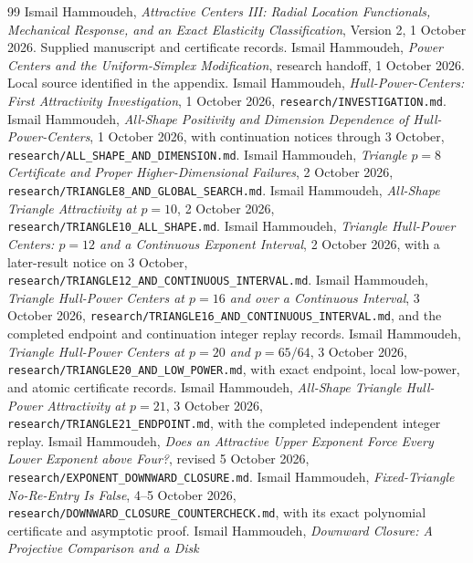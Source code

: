 \documentclass[11pt]{article}
\theoremstyle{definition}
\newcommand{\pathcode}[1]{\nolinkurl{#1}}
\begin{document}
\begin{thebibliography}{99}
Ismail Hammoudeh, \emph{Attractive Centers III: Radial Location Functionals,
Mechanical Response, and an Exact Elasticity Classification}, Version 2,
1 October 2026. Supplied manuscript and certificate records.
Ismail Hammoudeh, \emph{Power Centers and the Uniform-Simplex Modification}, research handoff,
1 October 2026. Local source identified in the appendix.
Ismail Hammoudeh, \emph{Hull-Power-Centers: First Attractivity Investigation},
1 October 2026, \pathcode{research/INVESTIGATION.md}.
Ismail Hammoudeh, \emph{All-Shape Positivity and Dimension Dependence of Hull-Power-Centers},
1 October 2026, with continuation notices through 3 October,
\pathcode{research/ALL_SHAPE_AND_DIMENSION.md}.
Ismail Hammoudeh, \emph{Triangle $p=8$ Certificate and Proper Higher-Dimensional Failures},
2 October 2026, \pathcode{research/TRIANGLE8_AND_GLOBAL_SEARCH.md}.
Ismail Hammoudeh, \emph{All-Shape Triangle Attractivity at $p=10$}, 2 October 2026,
\pathcode{research/TRIANGLE10_ALL_SHAPE.md}.
Ismail Hammoudeh, \emph{Triangle Hull-Power Centers: $p=12$ and a Continuous Exponent Interval},
2 October 2026, with a later-result notice on 3 October,
\pathcode{research/TRIANGLE12_AND_CONTINUOUS_INTERVAL.md}.
Ismail Hammoudeh, \emph{Triangle Hull-Power Centers at $p=16$ and over a Continuous Interval},
3 October 2026, \pathcode{research/TRIANGLE16_AND_CONTINUOUS_INTERVAL.md},
and the completed endpoint and continuation integer replay records.
Ismail Hammoudeh, \emph{Triangle Hull-Power Centers at $p=20$ and $p=65/64$},
3 October 2026, \pathcode{research/TRIANGLE20_AND_LOW_POWER.md},
with exact endpoint, local low-power, and atomic certificate records.
Ismail Hammoudeh, \emph{All-Shape Triangle Hull-Power Attractivity at $p=21$},
3 October 2026, \pathcode{research/TRIANGLE21_ENDPOINT.md},
with the completed independent integer replay.
Ismail Hammoudeh, \emph{Does an Attractive Upper Exponent Force Every Lower
Exponent above Four?}, revised 5 October 2026,
\pathcode{research/EXPONENT_DOWNWARD_CLOSURE.md}.
Ismail Hammoudeh, \emph{Fixed-Triangle No-Re-Entry Is False},
4--5 October 2026, \pathcode{research/DOWNWARD_CLOSURE_COUNTERCHECK.md},
with its exact polynomial certificate and asymptotic proof.
Ismail Hammoudeh, \emph{Downward Closure: A Projective Comparison and a Disk
}
\end{thebibliography}
\end{document}
